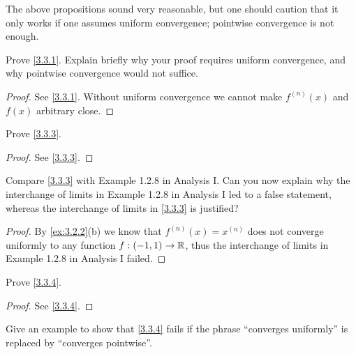 \begin{rmk}\label{3.3.7}
  The above propositions sound very reasonable, but one should caution that it only works if one assumes uniform convergence;
  pointwise convergence is not enough.
\end{rmk}

\exercisesection

\begin{ex}\label{ex:3.3.1}
  Prove \cref{3.3.1}.
  Explain briefly why your proof requires uniform convergence, and why pointwise convergence would not suffice.
\end{ex}

\begin{proof}
  See \cref{3.3.1}.
  Without uniform convergence we cannot make \(f^{(n)}(x)\) and \(f(x)\) arbitrary close.
\end{proof}

\begin{ex}\label{ex:3.3.2}
  Prove \cref{3.3.3}.
\end{ex}

\begin{proof}
  See \cref{3.3.3}.
\end{proof}

\begin{ex}\label{ex:3.3.3}
  Compare \cref{3.3.3} with Example 1.2.8 in Analysis I.
  Can you now explain why the interchange of limits in Example 1.2.8 in Analysis I led to a false statement, whereas the interchange of limits in \cref{3.3.3} is justified?
\end{ex}

\begin{proof}
  By \cref{ex:3.2.2}(b) we know that \(f^{(n)}(x) = x^{(n)}\) does not converge uniformly to any function \(f : (-1, 1) \to \mathbb{R}\), thus the interchange of limits in Example 1.2.8 in Analysis I failed.
\end{proof}

\begin{ex}\label{ex:3.3.4}
  Prove \cref{3.3.4}.
\end{ex}

\begin{proof}
  See \cref{3.3.4}.
\end{proof}

\begin{ex}\label{ex:3.3.5}
  Give an example to show that \cref{3.3.4} fails if the phrase ``converges uniformly'' is replaced by ``converges pointwise''.
\end{ex}

